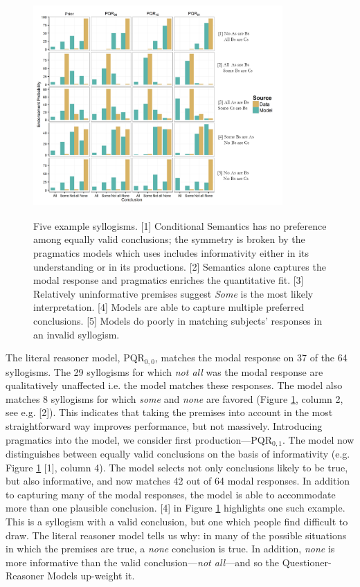 \documentclass[10pt,letterpaper]{article}
\begin{document}
\begin{figure}
\centering
    \includegraphics[width=0.85\textwidth,height=8.5cm]{fig1_multibar_alpha2_br25_n6_diverge_wtitles}
    \caption{Five example syllogisms. 
    [1] Conditional Semantics has no preference among equally valid conclusions; the symmetry is broken by the pragmatics models which uses includes informativity either in its understanding or in its productions.     
    [2] Semantics alone captures the modal response and pragmatics enriches the quantitative fit.     
    [3] Relatively uninformative premises suggest \emph{Some} is the most likely interpretation. 
    [4] Models are able to capture multiple preferred conclusions. 
    [5] Models do poorly in matching subjects' responses in an invalid syllogism.}
  \label{fig:barplots}
\end{figure}


The literal reasoner model, PQR$_{0,0}$, matches the modal response on 37 of the 64 syllogisms. The 29 syllogisms for which \emph{not all} was the modal response are qualitatively unaffected i.e. the model matches these responses. The model also matches 8 syllogisms for which \emph{some} and \emph{none} are favored (Figure \ref{fig:barplots}, column 2, see e.g. [2]). This indicates that taking the premises into account in the most straightforward way improves performance, but not massively.
%
Introducing pragmatics into the model, we consider first production---PQR$_{0,1}$. The model now distinguishes between equally valid conclusions on the basis of informativity (e.g. Figure \ref{fig:barplots} [1], column 4). The model selects not only conclusions likely to be true, but also informative, and now matches 42 out of 64 modal responses. 
%
In addition to capturing many of the modal responses, the model is able to accommodate more than one plausible conclusion. [4] in Figure \ref{fig:barplots} highlights one such example. This is a syllogism with a valid conclusion, but one which people find difficult to draw. The literal reasoner model tells us why: in many of the possible situations in which the premises are true, a \emph{none} conclusion is true. In addition, \emph{none} is more informative than the valid conclusion---\emph{not all}---and so the Questioner-Reasoner Models up-weight it.
\end{document}
